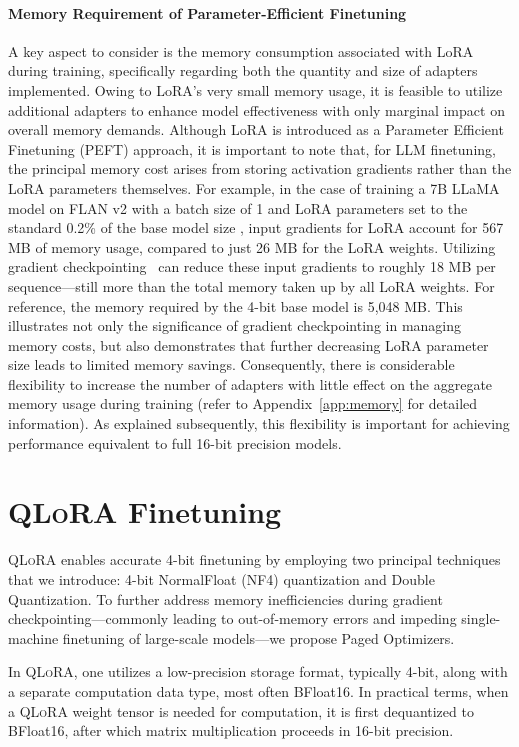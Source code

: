 \paragraph{Memory Requirement of Parameter-Efficient Finetuning} A key aspect to consider is the memory consumption associated with LoRA during training, specifically regarding both the quantity and size of adapters implemented. Owing to LoRA's very small memory usage, it is feasible to utilize additional adapters to enhance model effectiveness with only marginal impact on overall memory demands. Although LoRA is introduced as a Parameter Efficient Finetuning (PEFT) approach, it is important to note that, for LLM finetuning, the principal memory cost arises from storing activation gradients rather than the LoRA parameters themselves. For example, in the case of training a 7B LLaMA model on FLAN v2 with a batch size of 1 and LoRA parameters set to the standard 0.2\% of the base model size \citep{hu2021lora,liu2022few}, input gradients for LoRA account for 567 MB of memory usage, compared to just 26 MB for the LoRA weights. Utilizing gradient checkpointing~\citep{chen2016training} can reduce these input gradients to roughly 18 MB per sequence—still more than the total memory taken up by all LoRA weights. For reference, the memory required by the 4-bit base model is 5,048 MB. This illustrates not only the significance of gradient checkpointing in managing memory costs, but also demonstrates that further decreasing LoRA parameter size leads to limited memory savings. Consequently, there is considerable flexibility to increase the number of adapters with little effect on the aggregate memory usage during training (refer to Appendix~\ref{app:memory} for detailed information). As explained subsequently, this flexibility is important for achieving performance equivalent to full 16-bit precision models.

\section{\textsc{QLoRA} Finetuning}

\textsc{QLoRA} enables accurate 4-bit finetuning by employing two principal techniques that we introduce: 4-bit NormalFloat (NF4) quantization and Double Quantization. To further address memory inefficiencies during gradient checkpointing—commonly leading to out-of-memory errors and impeding single-machine finetuning of large-scale models—we propose Paged Optimizers.

In \textsc{QLoRA}, one utilizes a low-precision storage format, typically 4-bit, along with a separate computation data type, most often BFloat16. In practical terms, when a \textsc{QLoRA} weight tensor is needed for computation, it is first dequantized to BFloat16, after which matrix multiplication proceeds in 16-bit precision.

